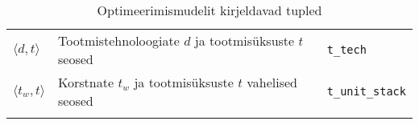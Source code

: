 \begin{table}
\begin{tabular}{l l l}
$\langle d, t \rangle$      & Tootmistehnoloogiate $d$ ja tootmisüksuste $t$ seosed & \texttt{t\_tech}\\
$\langle t_w, t \rangle$    & Korstnate $t_w$ ja tootmisüksuste $t$ vahelised seosed & \texttt{t\_unit\_stack}\\
&&
\end{tabular}
\caption{Optimeerimismudelit kirjeldavad tupled \label{tab:tupled}}
\end{table}
